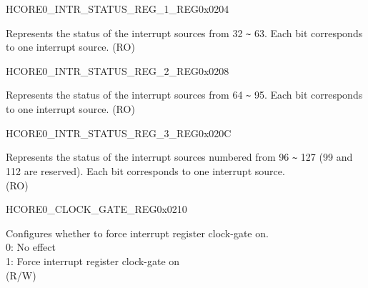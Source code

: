 \begin{register}{H}{CORE0\_INTR\_STATUS\_REG\_1\_REG}{0x0204}\label{regdesc:CORE0INTRSTATUSREG1REG}
%
\regnewline%
\begin{regdesc}\begin{reglist}
\label{fielddesc:CORE0INTRSTATUS1}\item [CORE0\_INTR\_STATUS\_1] Represents the status of the interrupt sources from 32 \verb+~+ 63. Each bit corresponds to one interrupt source. (RO)
\end{reglist}\end{regdesc}
\end{register}


\begin{register}{H}{CORE0\_INTR\_STATUS\_REG\_2\_REG}{0x0208}\label{regdesc:CORE0INTRSTATUSREG2REG}
%
\regnewline%
\begin{regdesc}\begin{reglist}
\label{fielddesc:CORE0INTRSTATUS2}\item [CORE0\_INTR\_STATUS\_2] Represents the status of the interrupt sources from 64 \verb+~+ 95. Each bit corresponds to one interrupt source. (RO)
\end{reglist}\end{regdesc}
\end{register}


\begin{register}{H}{CORE0\_INTR\_STATUS\_REG\_3\_REG}{0x020C}\label{regdesc:CORE0INTRSTATUSREG3REG}
%
\regnewline%
\begin{regdesc}\begin{reglist}
\label{fielddesc:CORE0INTRSTATUS3}\item [CORE0\_INTR\_STATUS\_3] Represents the status of the interrupt sources numbered from 96 \verb+~+ 127 (99 and 112 are reserved). Each bit corresponds to one interrupt source. \\
(RO)
\end{reglist}\end{regdesc}
\end{register}


\begin{register}{H}{CORE0\_CLOCK\_GATE\_REG}{0x0210}\label{regdesc:CORE0CLOCKGATEREG}
%
%
\regnewline%
\begin{regdesc}\begin{reglist}
\label{fielddesc:CORE0REGCLKEN}\item [CORE0\_REG\_CLK\_EN] Configures whether to force interrupt register clock-gate on.\\
0: No effect \\
1: Force interrupt register clock-gate on \\
(R/W)
\end{reglist}\end{regdesc}
\end{register}

